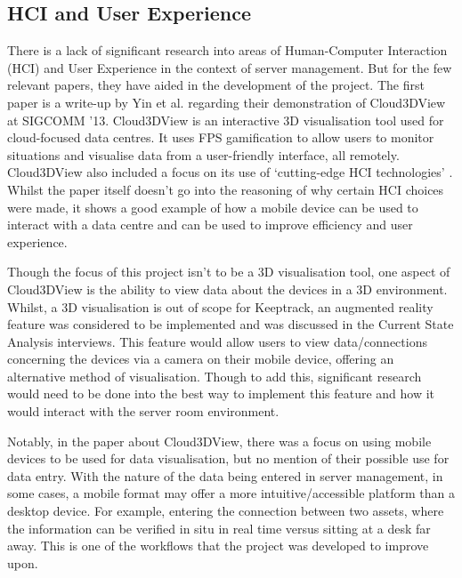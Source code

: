 \documentclass [11pt,a4paper]{article}
\begin{document}
\subsection{HCI and User Experience}
\label{sec:HCI}
There is a lack of significant research into areas of Human-Computer Interaction (HCI) and User Experience in the context of server management. But for the few relevant papers, they have aided in the development of the project. The first paper is a write-up by Yin et al. \cite{cloud3dview} regarding their demonstration of Cloud3DView at SIGCOMM '13. Cloud3DView is an interactive 3D visualisation tool used for cloud-focused data centres. It uses FPS gamification to allow users to monitor situations and visualise data from a user-friendly interface, all remotely. Cloud3DView also included a focus on its use of `cutting-edge HCI technologies' \cite{cloud3dview}. Whilst the paper itself doesn't go into the reasoning of why certain HCI choices were made, it shows a good example of how a mobile device can be used to interact with a data centre and can be used to improve efficiency and user experience. 

Though the focus of this project isn't to be a 3D visualisation tool, one aspect of Cloud3DView is the ability to view data about the devices in a 3D environment. Whilst, a 3D visualisation is out of scope for Keeptrack, an augmented reality feature was considered to be implemented and was discussed in the Current State Analysis interviews. This feature would allow users to view data/connections concerning the devices via a camera on their mobile device, offering an alternative method of visualisation. Though to add this, significant research would need to be done into the best way to implement this feature and how it would interact with the server room environment.

Notably, in the paper about Cloud3DView, there was a focus on using mobile devices to be used for data visualisation, but no mention of their possible use for data entry. With the nature of the data being entered in server management, in some cases, a mobile format may offer a more intuitive/accessible platform than a desktop device. For example, entering the connection between two assets, where the information can be verified in situ in real time versus sitting at a desk far away. This is one of the workflows that the project was developed to improve upon.
\end{document}
